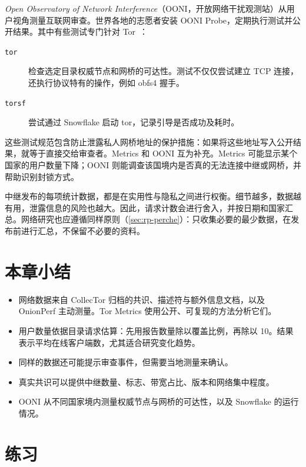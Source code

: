 \emph{Open Observatory of Network Interference}（OONI，开放网络干扰观测站）从用户视角测量互联网审查。世界各地的志愿者安装 OONI Probe，定期执行测试并公开结果。其中有些测试专门针对 Tor~\cite{oonitor}：
\begin{description}
  \item[\texttt{tor}] 检查选定目录权威节点和网桥的可达性。测试不仅仅尝试建立 TCP 连接，还执行协议特有的操作，例如 obfs4 握手。
  \item[\texttt{torsf}] 尝试通过 Snowflake 启动 tor，记录引导是否成功及耗时。
\end{description}
这些测试规范包含防止泄露私人网桥地址的保护措施：如果将这些地址写入公开结果，就等于直接交给审查者。Metrics 和 OONI 互为补充。Metrics 可能显示某个国家的用户数量下降；OONI 则能调查该国境内是否真的无法连接中继或网桥，并帮助识别封锁方式。

\begin{approfondimento}[测量不能造成伤害]
中继发布的每项统计数据，都是在实用性与隐私之间进行权衡。细节越多，数据越有用，泄露信息的风险也越大。因此，请求计数会进行舍入，并按日期和国家汇总。网络研究也应遵循同样原则（\cref{sec:rp-perche}）：只收集必要的最少数据，在发布前进行汇总，不保留不必要的资料。
\end{approfondimento}

\section*{本章小结}
\begin{itemize}
  \item 网络数据来自 CollecTor 归档的共识、描述符与额外信息文档，以及 OnionPerf 主动测量。Tor Metrics 使用公开、可复现的方法分析它们。
  \item 用户数量依据目录请求估算：先用报告数量除以覆盖比例，再除以 10。结果表示平均在线客户端数，尤其适合研究变化趋势。
  \item 同样的数据还可能提示审查事件，但需要当地测量来确认。
  \item 真实共识可以提供中继数量、标志、带宽占比、版本和网络集中程度。
  \item OONI 从不同国家境内测量权威节点与网桥的可达性，以及 Snowflake 的运行情况。
\end{itemize}

\section*{练习}

